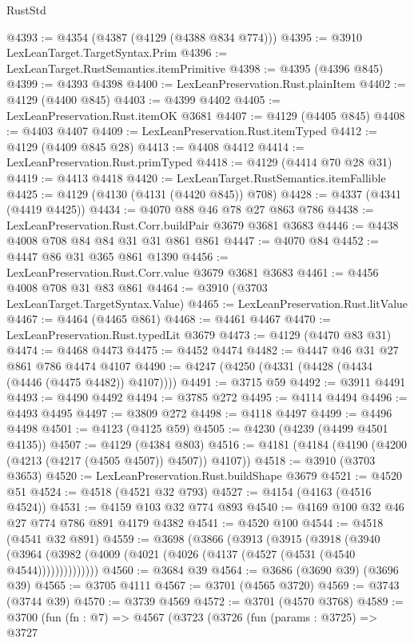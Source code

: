 \begin{lexlean}{RustStd}
\begin{coremodule}
{\begin{coremodule}
{{{{{{{{{{{{{{@4393 := @4354 (@4387 (@4129 (@4388 @834 @774)))
@4395 := @3910 LexLeanTarget.TargetSyntax.Prim
@4396 := LexLeanTarget.RustSemantics.itemPrimitive
@4398 := @4395 (@4396 @845)
@4399 := @4393 @4398
@4400 := LexLeanPreservation.Rust.plainItem
@4402 := @4129 (@4400 @845)
@4403 := @4399 @4402
@4405 := LexLeanPreservation.Rust.itemOK @3681
@4407 := @4129 (@4405 @845)
@4408 := @4403 @4407
@4409 := LexLeanPreservation.Rust.itemTyped
@4412 := @4129 (@4409 @845 @28)
@4413 := @4408 @4412
@4414 := LexLeanPreservation.Rust.primTyped
@4418 := @4129 (@4414 @70 @28 @31)
@4419 := @4413 @4418
@4420 := LexLeanTarget.RustSemantics.itemFallible
@4425 := @4129 (@4130 (@4131 (@4420 @845)) @708)
@4428 := @4337 (@4341 (@4419 @4425))
@4434 := @4070 @88 @46 @78 @27 @863 @786
@4438 := LexLeanPreservation.Rust.Corr.buildPair @3679 @3681 @3683
@4446 := @4438 @4008 @708 @84 @84 @31 @31 @861 @861
@4447 := @4070 @84
@4452 := @4447 @86 @31 @365 @861 @1390
@4456 := LexLeanPreservation.Rust.Corr.value @3679 @3681 @3683
@4461 := @4456 @4008 @708 @31 @83 @861
@4464 := @3910 (@3703 LexLeanTarget.TargetSyntax.Value)
@4465 := LexLeanPreservation.Rust.litValue
@4467 := @4464 (@4465 @861)
@4468 := @4461 @4467
@4470 := LexLeanPreservation.Rust.typedLit @3679
@4473 := @4129 (@4470 @83 @31)
@4474 := @4468 @4473
@4475 := @4452 @4474
@4482 := @4447 @46 @31 @27 @861 @786 @4474 @4107
@4490 := @4247 (@4250 (@4331 (@4428 (@4434 (@4446 (@4475 @4482)) @4107))))
@4491 := @3715 @59
@4492 := @3911 @4491
@4493 := @4490 @4492
@4494 := @3785 @272
@4495 := @4114 @4494
@4496 := @4493 @4495
@4497 := @3809 @272
@4498 := @4118 @4497
@4499 := @4496 @4498
@4501 := @4123 (@4125 @59)
@4505 := @4230 (@4239 (@4499 @4501 @4135))
@4507 := @4129 (@4384 @803)
@4516 := @4181 (@4184 (@4190 (@4200 (@4213 (@4217 (@4505 @4507)) @4507)) @4107))
@4518 := @3910 (@3703 @3653)
@4520 := LexLeanPreservation.Rust.buildShape @3679
@4521 := @4520 @51
@4524 := @4518 (@4521 @32 @793)
@4527 := @4154 (@4163 (@4516 @4524))
@4531 := @4159 @103 @32 @774 @893
@4540 := @4169 @100 @32 @46 @27 @774 @786 @891 @4179 @4382
@4541 := @4520 @100
@4544 := @4518 (@4541 @32 @891)
@4559 := @3698
    (@3866
      (@3913
        (@3915
          (@3918
            (@3940
              (@3964 (@3982 (@4009 (@4021 (@4026 (@4137 (@4527 (@4531 (@4540 @4544))))))))))))))
@4560 := @3684 @39
@4564 := @3686 (@3690 @39) (@3696 @39)
@4565 := @3705 @4111
@4567 := @3701 (@4565 @3720)
@4569 := @3743 (@3744 @39)
@4570 := @3739 @4569
@4572 := @3701 (@4570 @3768)
@4589 := @3700
    (fun (fn : @7) =>
    @4567
      (@3723
        (@3726
          (fun (params : @3725) =>
          @3727
}}}}}}}}}}}}}}
\end{coremodule}}
\end{coremodule}
\end{lexlean}
